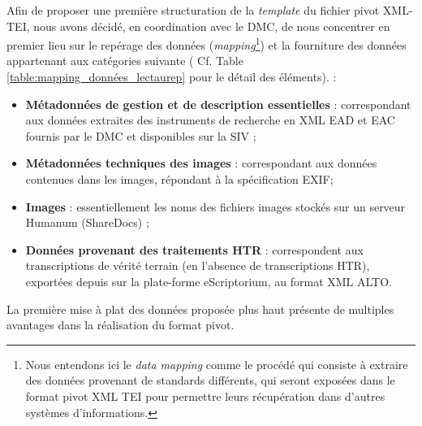 Afin de proposer une première structuration de la \textit{template} du fichier pivot XML-TEI, nous avons décidé, en coordination avec le DMC, de nous concentrer en premier lieu sur le repérage des données (\textit{mapping}\footnote{Nous entendons ici le \textit{data mapping} comme le procédé qui consiste à extraire des données provenant de standards différents, qui seront exposées dans le format pivot XML TEI pour permettre leurs récupération dans d'autres systèmes d'informations.}) et la fourniture des données appartenant aux catégories suivante ( Cf. Table \ref{table:mapping_données_lectaurep} pour le détail des éléments). :  
\bigskip
\begin{itemize}
    \item \textbf{Métadonnées de gestion et de description essentielles} : correspondant aux données extraites des instruments de recherche en XML EAD et EAC fournis par le DMC et disponibles sur la SIV ;
    \item \textbf{Métadonnées techniques des images} : correspondant aux données contenues dans les images, répondant à la spécification EXIF;
    \item \textbf{Images} : essentiellement les noms des fichiers images stockés sur un serveur Humanum (ShareDocs) ;
    \item \textbf{Données provenant des traitements HTR} : correspondent aux transcriptions de vérité terrain (en l'absence de transcriptions HTR), exportées depuis sur la plate-forme eScriptorium, au format XML ALTO.
\end{itemize}
\bigskip
La première mise à plat des données proposée plus haut présente de multiples avantages dans la réalisation du format pivot.\\ 

